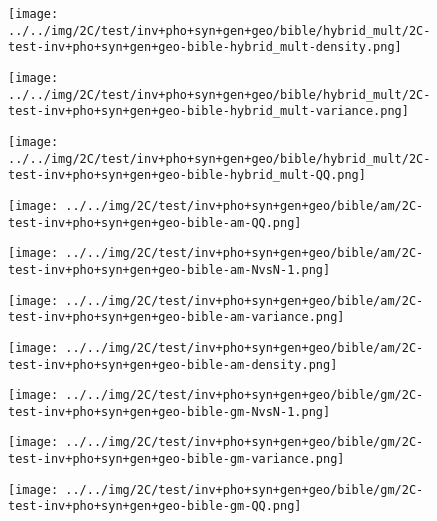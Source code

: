 \begin{figure}[H]
\centering	\texttt{[image: ../../img/2C/test/inv+pho+syn+gen+geo/bible/hybrid\_mult/2C-test-inv+pho+syn+gen+geo-bible-hybrid\_mult-density.png]}
\end{figure}
\begin{figure}[H]
\centering	\texttt{[image: ../../img/2C/test/inv+pho+syn+gen+geo/bible/hybrid\_mult/2C-test-inv+pho+syn+gen+geo-bible-hybrid\_mult-variance.png]}
\end{figure}
\begin{figure}[H]
\centering	\texttt{[image: ../../img/2C/test/inv+pho+syn+gen+geo/bible/hybrid\_mult/2C-test-inv+pho+syn+gen+geo-bible-hybrid\_mult-QQ.png]}
\end{figure}
\begin{figure}[H]
\centering	\texttt{[image: ../../img/2C/test/inv+pho+syn+gen+geo/bible/am/2C-test-inv+pho+syn+gen+geo-bible-am-QQ.png]}
\end{figure}
\begin{figure}[H]
\centering	\texttt{[image: ../../img/2C/test/inv+pho+syn+gen+geo/bible/am/2C-test-inv+pho+syn+gen+geo-bible-am-NvsN-1.png]}
\end{figure}
\begin{figure}[H]
\centering	\texttt{[image: ../../img/2C/test/inv+pho+syn+gen+geo/bible/am/2C-test-inv+pho+syn+gen+geo-bible-am-variance.png]}
\end{figure}
\begin{figure}[H]
\centering	\texttt{[image: ../../img/2C/test/inv+pho+syn+gen+geo/bible/am/2C-test-inv+pho+syn+gen+geo-bible-am-density.png]}
\end{figure}
\begin{figure}[H]
\centering	\texttt{[image: ../../img/2C/test/inv+pho+syn+gen+geo/bible/gm/2C-test-inv+pho+syn+gen+geo-bible-gm-NvsN-1.png]}
\end{figure}
\begin{figure}[H]
\centering	\texttt{[image: ../../img/2C/test/inv+pho+syn+gen+geo/bible/gm/2C-test-inv+pho+syn+gen+geo-bible-gm-variance.png]}
\end{figure}
\begin{figure}[H]
\centering	\texttt{[image: ../../img/2C/test/inv+pho+syn+gen+geo/bible/gm/2C-test-inv+pho+syn+gen+geo-bible-gm-QQ.png]}
\end{figure}
